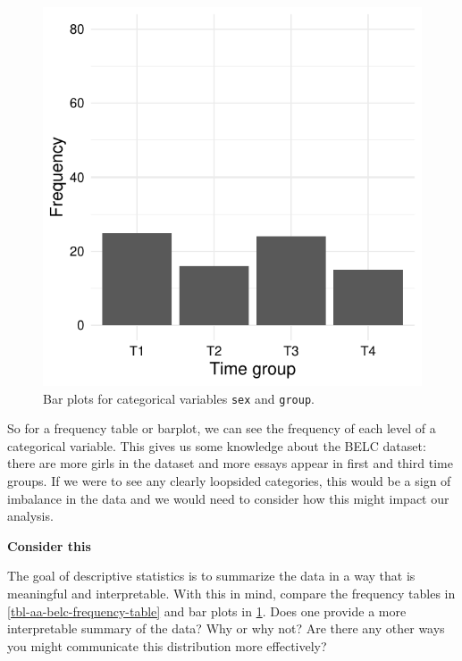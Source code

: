 \documentclass[
  letterpaper,
]{latex/krantz}
\theoremstyle{definition}
\theoremstyle{remark}
\begin{document}
\begin{figure}[H]
\begin{minipage}{0.50\linewidth}
{\includegraphics{part_2/3_analysis_files/figure-pdf/fig-aa-belc-barplots-2.pdf}

}


\end{minipage}%

\caption{\label{fig-aa-belc-barplots}Bar plots for categorical variables
\texttt{sex} and \texttt{group}.}

\end{figure}%

So for a frequency table or barplot, we can see the frequency of each
level of a categorical variable. This gives us some knowledge about the
BELC dataset: there are more girls in the dataset and more essays appear
in first and third time groups. If we were to see any clearly loopsided
categories, this would be a sign of imbalance in the data and we would
need to consider how this might impact our analysis.

\begin{tcolorbox}[enhanced jigsaw, colframe=quarto-callout-color-frame, breakable, bottomrule=.15mm, arc=.35mm, left=2mm, opacityback=0, rightrule=.15mm, colback=white, toprule=.15mm, leftrule=.75mm]

\textbf{ Consider this}

The goal of descriptive statistics is to summarize the data in a way
that is meaningful and interpretable. With this in mind, compare the
frequency tables in \ref{tbl-aa-belc-frequency-table} and bar plots in
\ref{fig-aa-belc-barplots}. Does one provide a more interpretable
summary of the data? Why or why not? Are there any other ways you might
communicate this distribution more effectively?

\end{tcolorbox}
\end{document}
